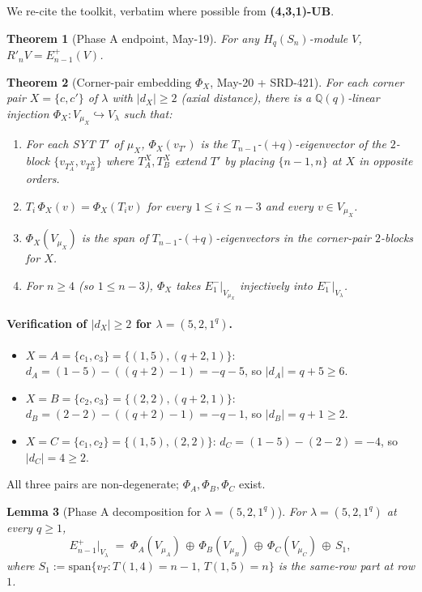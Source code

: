 \documentclass[11pt]{article}
\newtheorem{theorem}{Theorem}
\newtheorem{lemma}[theorem]{Lemma}
\theoremstyle{definition}
\begin{document}
We re-cite the toolkit, verbatim where possible from \textbf{(4,3,1)-UB}.

\begin{theorem}[Phase A endpoint, May-19]\label{thm:phaseA}
For any $H_q(S_n)$-module $V$, $R'_n V = E_{n-1}^+(V)$.
\end{theorem}

\begin{theorem}[Corner-pair embedding $\Phi_X$, May-20 + SRD-421]\label{thm:Phi}
For each corner pair $X = \{c, c'\}$ of $\lambda$ with $|d_X| \ge 2$
(axial distance), there is a $\mathbb{Q}(q)$-linear injection
$\Phi_X : V_{\mu_X} \hookrightarrow V_\lambda$ such that:
\begin{enumerate}[leftmargin=2em,topsep=0.2em,itemsep=0.1em]
\item For each SYT $T'$ of $\mu_X$, $\Phi_X(v_{T'})$ is the
$T_{n-1}$-$(+q)$-eigenvector of the $2$-block
$\{v_{T_A^X}, v_{T_B^X}\}$ where $T_A^X, T_B^X$ extend $T'$ by
placing $\{n-1, n\}$ at $X$ in opposite orders.
\item $T_i \, \Phi_X(v) = \Phi_X(T_i v)$ for every
$1 \le i \le n - 3$ and every $v \in V_{\mu_X}$.
\item $\Phi_X(V_{\mu_X})$ is the span of $T_{n-1}$-$(+q)$-eigenvectors
in the corner-pair $2$-blocks for $X$.
\item For $n \ge 4$ (so $1 \le n - 3$), $\Phi_X$ takes
$E_1^-|_{V_{\mu_X}}$ injectively into $E_1^-|_{V_\lambda}$.
\end{enumerate}
\end{theorem}

\paragraph{Verification of $|d_X| \ge 2$ for $\lambda = (5, 2, 1^q)$.}
\begin{itemize}[leftmargin=2em,topsep=0.2em,itemsep=0.1em]
\item $X = A = \{c_1, c_3\} = \{(1, 5), (q+2, 1)\}$:
$d_A = (1 - 5) - ((q+2) - 1) = -q - 5$, so $|d_A| = q + 5 \ge 6$.
\item $X = B = \{c_2, c_3\} = \{(2, 2), (q+2, 1)\}$:
$d_B = (2 - 2) - ((q+2) - 1) = -q - 1$, so $|d_B| = q + 1 \ge 2$.
\item $X = C = \{c_1, c_2\} = \{(1, 5), (2, 2)\}$:
$d_C = (1 - 5) - (2 - 2) = -4$, so $|d_C| = 4 \ge 2$.
\end{itemize}
All three pairs are non-degenerate; $\Phi_A, \Phi_B, \Phi_C$ exist.

\begin{lemma}[Phase A decomposition for $\lambda = (5, 2, 1^q)$]\label{lem:phaseA-decomp}
For $\lambda = (5, 2, 1^q)$ at every $q \ge 1$,
\begin{equation}\label{eq:phaseA-decomp}
   E_{n-1}^+|_{V_\lambda}
   \;=\;
   \Phi_A(V_{\mu_A})
   \,\oplus\, \Phi_B(V_{\mu_B})
   \,\oplus\, \Phi_C(V_{\mu_C})
   \,\oplus\, S_1,
\end{equation}
where $S_1 := \mathrm{span}\{v_T : T(1, 4) = n - 1,\, T(1, 5) = n\}$ is
the same-row part at row $1$.
\end{lemma}
\end{document}
